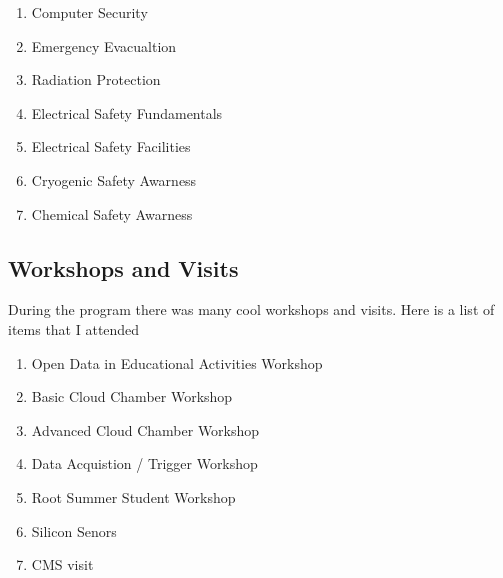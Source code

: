 \documentclass{article}
\begin{document}
\begin{enumerate}
\item Computer Security
\item Emergency Evacualtion
\item Radiation Protection
\item Electrical Safety Fundamentals
\item Electrical Safety Facilities
\item Cryogenic Safety Awarness
\item Chemical Safety Awarness
\end{enumerate}

\subsection{Workshops and Visits}
During the program there was many cool workshops and visits. Here is a list of items that I attended

\begin{enumerate}

\item Open Data in Educational Activities Workshop
\item Basic Cloud Chamber Workshop
\item Advanced Cloud Chamber Workshop
\item Data Acquistion / Trigger Workshop
\item Root Summer Student Workshop
\item Silicon Senors
\item CMS visit
\end{enumerate} 
\end{document}
